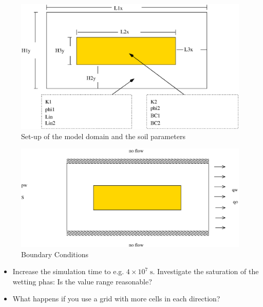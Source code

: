 \begin{figure}[ht]
\centering
\includegraphics[width=0.8\linewidth,keepaspectratio]{EPS/Ex2_Domain.eps}
\caption{Set-up of the model domain and the soil parameters}\label{tutorial1:ex2_Domain}
\end{figure}

\begin{figure}[ht]
\centering
\includegraphics[width=0.8\linewidth,keepaspectratio]{EPS/Ex2_Boundary.eps}
\caption{Boundary Conditions}\label{tutorial1:ex2_BC}
\end{figure}

\begin{itemize}
\item Increase the simulation time to e.g. $4\times 10^7
  \;\text{s}$. Investigate the saturation of the wetting phas: Is the
  value range reasonable?
\item What happens if you use a grid with more cells in each direction?
\end{itemize}

